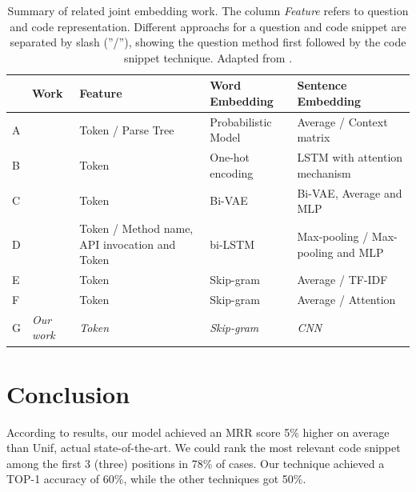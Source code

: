 \documentclass[sigconf]{acmart}
\begin{document}
\begin{table}[t]
\centering
\begin{tabular}{ p{0.1cm} p{2cm} p{1.5cm} p{1.5cm} p{1.5cm} }
 \hline
 & \textbf{Work} & \textbf{Feature} & \textbf{Word Embedding} & \textbf{Sentence Embedding} \\
 \hline
A & \citet{Allamanis-bimodal-source-code-natural-language:2015} & Token / Parse Tree & Probabilistic Model & Average / Context matrix  \\

B &\citet{iyer-etal-2016-summarizing} & Token & One-hot encoding & LSTM with attention mechanism  \\

C &\citet{Chen-bi-variational-autoencoder:2018} & Token & Bi-VAE & Bi-VAE, Average and MLP  \\

D &\citet{Gu-deep-code-search:2018} & Token / Method name, API invocation and Token & bi-LSTM & Max-pooling / Max-pooling and MLP   \\

E &\citet{Sachdev-neural-code-search:2018} & Token & Skip-gram & Average / TF-IDF   \\

F &\citet{cambronero-deep-code-search-2019} & Token & Skip-gram & Average / Attention   \\

G & \textit{Our work} & \textit{Token} & \textit{Skip-gram} & \textit{CNN}   \\

 \hline
\end{tabular}
\caption{Summary of related joint embedding work. The column \emph{Feature} refers to question and code representation. Different approachs for a question and code snippet are separated by slash (''/''), showing the question method first followed by the code snippet technique. Adapted from \cite{yan-benchmark-code-search-information-retrieval-deep-learning:2020}.}
\label{table:summary-joint-embedding-related-work}
\end{table}

\section{Conclusion}

According to results, our model achieved an MRR score 5\% higher on average than Unif, actual state-of-the-art. We could rank the most relevant code snippet among the first 3 (three) positions in 78\% of cases. Our technique achieved a TOP-1 accuracy of 60\%, while the other techniques got 50\%. 
\end{document}

